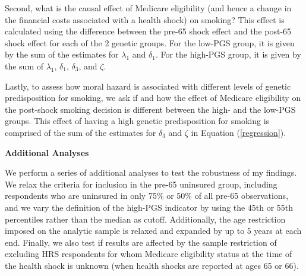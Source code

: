 \documentclass[12pt]{article}
\begin{document}
Second, what is the causal effect of Medicare eligibility (and hence a change in the financial costs associated with a health shock) on smoking? This effect is calculated using the difference between the pre-65 shock effect and the post-65 shock effect for each of the 2 genetic groups. For the low-PGS group, it is given by the sum of the estimates for $\lambda_1$ and $\delta_1$. For the high-PGS group, it is given by the sum of  $\lambda_1$, $\delta_1$, $\delta_3$, and $\zeta$.

Lastly, to assess how moral hazard is associated with different levels of genetic predisposition for smoking, we ask if and how the effect of Medicare eligibility on the post-shock smoking decision is different between the high- and the low-PGS groups. This effect of having a high genetic predisposition for smoking is comprised of the sum of the estimates for $\delta_3$ and $\zeta$ in Equation (\ref{regression}).




\vspace{5mm}

\noindent \textbf{\textsf{\textcolor{NavyBlue}{Additional Analyses}}}

\noindent We perform a series of additional analyses to test the robustness of my findings. We relax the criteria for inclusion in the pre-65 uninsured group, including respondents who are uninsured in only 75\% or 50\% of all pre-65 observations, and we vary the definition of the high-PGS indicator by using the 45th or 55th percentiles rather than the median as cutoff. Additionally, the age restriction imposed on the analytic sample is relaxed and expanded by up to 5 years at each end. Finally, we also test if results are affected by the sample restriction of excluding HRS respondents for whom Medicare eligibility status at the time of the health shock is unknown (when health shocks are reported at ages 65 or 66).\\
\end{document}
